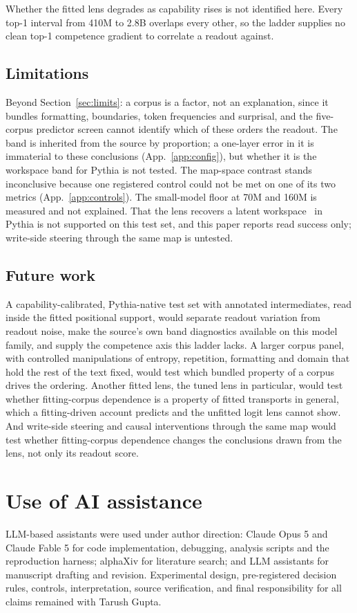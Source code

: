 \documentclass{article}
\begin{document}
Whether the fitted lens degrades as capability rises is not identified here. Every top-1 interval
from 410M to 2.8B overlaps every other, so the ladder supplies no clean top-1 competence gradient to correlate a readout against.

\subsection{Limitations}

Beyond Section~\ref{sec:limits}: a corpus is a factor, not an explanation, since it bundles
formatting, boundaries, token frequencies and surprisal, and the five-corpus predictor screen
cannot identify which of these orders the readout. The band is inherited from the source by
proportion; a one-layer error in it is immaterial to these conclusions (App.~\ref{app:config}),
but whether it is the workspace band for Pythia is not tested. The map-space contrast stands
inconclusive because one registered control could not be met on one of its two metrics
(App.~\ref{app:controls}). The small-model floor at 70M and 160M is measured and not explained.
That the lens recovers a latent workspace~\citep{dehaene1998workspace} in Pythia is not supported
on this test set, and this paper reports read success only; write-side steering through the same
map is untested.

\subsection{Future work}

A capability-calibrated, Pythia-native test set with annotated intermediates, read inside the fitted
positional support, would separate readout variation from readout noise, make the source's own
band diagnostics available on this model family, and supply the competence axis this ladder lacks.
A larger corpus panel, with controlled manipulations of entropy, repetition, formatting and domain
that hold the rest of the text fixed, would test which bundled property of a corpus drives the
ordering. Another fitted lens, the tuned lens in particular, would test whether fitting-corpus
dependence is a property of fitted transports in general, which a fitting-driven account predicts
and the unfitted logit lens cannot show. And write-side steering and causal interventions through
the same map would test whether fitting-corpus dependence changes the conclusions drawn from the
lens, not only its readout score.

\section{Use of AI assistance}

LLM-based assistants were used under author direction: Claude Opus 5 and Claude Fable 5 for code
implementation, debugging, analysis scripts and the reproduction harness; alphaXiv for literature
search; and LLM assistants for manuscript drafting and revision. Experimental design,
pre-registered decision rules, controls, interpretation, source verification, and final
responsibility for all claims remained with Tarush Gupta.
\end{document}
